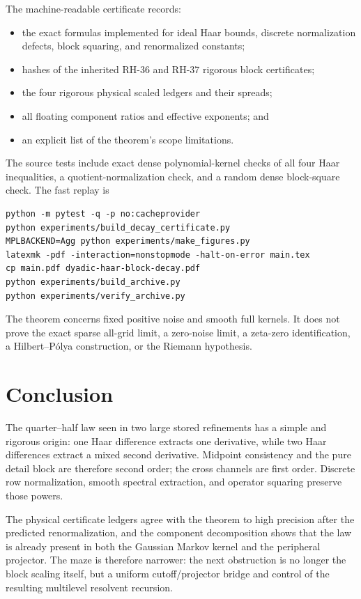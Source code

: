 \documentclass[11pt]{article}
\theoremstyle{definition}
\theoremstyle{remark}
\begin{document}
The machine-readable certificate records:

\begin{itemize}[leftmargin=2em]
 \item the exact formulas implemented for ideal Haar bounds, discrete
       normalization defects, block squaring, and renormalized constants;
 \item hashes of the inherited RH-36 and RH-37 rigorous block certificates;
 \item the four rigorous physical scaled ledgers and their spreads;
 \item all floating component ratios and effective exponents; and
 \item an explicit list of the theorem's scope limitations.
\end{itemize}

The source tests include exact dense polynomial-kernel checks of all four Haar
inequalities, a quotient-normalization check, and a random dense block-square
check.  The fast replay is

\begin{verbatim}
python -m pytest -q -p no:cacheprovider
python experiments/build_decay_certificate.py
MPLBACKEND=Agg python experiments/make_figures.py
latexmk -pdf -interaction=nonstopmode -halt-on-error main.tex
cp main.pdf dyadic-haar-block-decay.pdf
python experiments/build_archive.py
python experiments/verify_archive.py
\end{verbatim}

The theorem concerns fixed positive noise and smooth full kernels.  It does
not prove the exact sparse all-grid limit, a zero-noise limit, a zeta-zero
identification, a Hilbert--P\'olya construction, or the Riemann hypothesis.

\section{Conclusion}

The quarter--half law seen in two large stored refinements has a simple and
rigorous origin: one Haar difference extracts one derivative, while two Haar
differences extract a mixed second derivative.  Midpoint consistency and the
pure detail block are therefore second order; the cross channels are first
order.  Discrete row normalization, smooth spectral extraction, and operator
squaring preserve those powers.

The physical certificate ledgers agree with the theorem to high precision
after the predicted renormalization, and the component decomposition shows
that the law is already present in both the Gaussian Markov kernel and the
peripheral projector.  The maze is therefore narrower: the next obstruction
is no longer the block scaling itself, but a uniform cutoff/projector bridge
and control of the resulting multilevel resolvent recursion.



\end{document}
